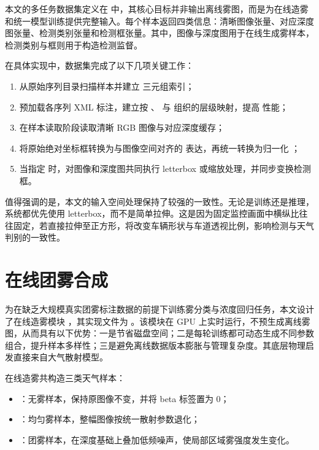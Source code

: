 本文的多任务数据集定义在  中，其核心目标并非输出离线雾图，而是为在线造雾和统一模型训练提供完整输入。每个样本返回四类信息：清晰图像张量、对应深度图张量、检测类别张量和检测框张量。其中，图像与深度图用于在线生成雾样本，检测类别与框则用于构造检测监督\cite{uadetrac}。

在具体实现中，数据集完成了以下几项关键工作：

\begin{enumerate}[leftmargin=2.5em]
\item 从原始序列目录扫描样本并建立  三元组索引；
\item 预加载各序列 XML 标注，建立按 、 与  组织的层级映射，提高  性能；
\item 在样本读取阶段读取清晰 RGB 图像与对应深度缓存；
\item 将原始绝对坐标框转换为与图像空间对齐的  表达，再统一转换为归一化 ；
\item 当指定  时，对图像和深度图共同执行 letterbox 或缩放处理，并同步变换检测框。
\end{enumerate}

值得强调的是，本文的输入空间处理保持了较强的一致性。无论是训练还是推理，系统都优先使用 letterbox，而不是简单拉伸。这是因为固定监控画面中横纵比往往固定，若直接拉伸至正方形，将改变车辆形状与车道透视比例，影响检测与天气判别的一致性。

\section{在线团雾合成}

为在缺乏大规模真实团雾标注数据的前提下训练雾分类与浓度回归任务，本文设计了在线造雾模块 ，其实现文件为 。该模块在 GPU 上实时运行，不预生成离线雾图，从而具有以下优势：一是节省磁盘空间；二是每轮训练都可动态生成不同参数组合，提升样本多样性；三是避免离线数据版本膨胀与管理复杂度。其底层物理启发直接来自大气散射模型\cite{koschmieder}。

在线造雾共构造三类天气样本：

\begin{itemize}[leftmargin=2em]
\item {}：无雾样本，保持原图像不变，并将 beta 标签置为 0；
\item {}：均匀雾样本，整幅图像按统一散射参数退化；
\item {}：团雾样本，在深度基础上叠加低频噪声，使局部区域雾强度发生变化。
\end{itemize}

